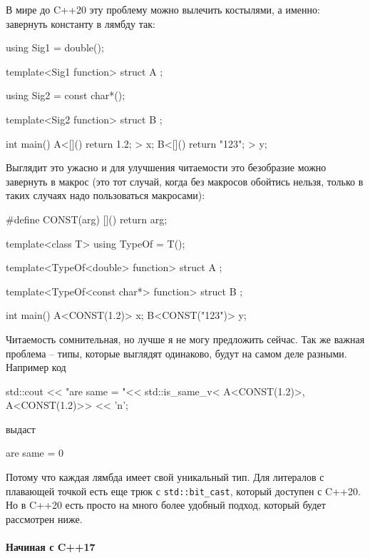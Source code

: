 В мире до C++20 эту проблему можно вылечить костылями, а именно: завернуть константу в лямбду так:
\begin{cppcode}
using Sig1 = double();

template<Sig1 function>
struct A {};

using Sig2 = const char*();

template<Sig2 function>
struct B {};

int main() {
  A<[](){ return 1.2; }> x;
  B<[](){ return "123"; }> y;
}
\end{cppcode}
Выглядит это ужасно и для улучшения читаемости это безобразие можно завернуть в макрос (это тот случай, когда без макросов обойтись нельзя, только в таких случаях надо пользоваться макросами):
\begin{cppcode}
#define CONST(arg) [](){ return arg; }

template<class T>
using TypeOf = T();

template<TypeOf<double> function>
struct A {};

template<TypeOf<const char*> function>
struct B {};

int main() {
  A<CONST(1.2)> x;
  B<CONST("123")> y;
}
\end{cppcode}
Читаемость сомнительная, но лучше я не могу предложить сейчас.
Так же важная проблема -- типы, которые выглядят одинаково, будут на самом деле разными.
Например код
\begin{cppcode}
std::cout << "are same = "<< std::is_same_v< A<CONST(1.2)>, A<CONST(1.2)>> << 'n';
\end{cppcode}
выдаст
\begin{cppcode}
are same = 0
\end{cppcode}
Потому что каждая лямбда имеет свой уникальный тип.
Для литералов с плавающей точкой есть еще трюк с \verb"std::bit_cast", который доступен с C++20.
Но в C++20 есть просто на много более удобный подход, который будет рассмотрен ниже.

\paragraph{Начиная с C++17}

